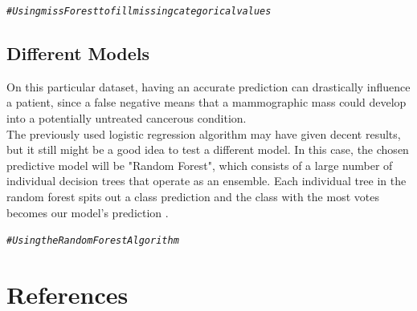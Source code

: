 \documentclass[a4paper,12pt]{article}\usepackage[]{graphicx}\usepackage[]{color}
\makeatletter
\newcommand{\hlcom}[1]{\textcolor[rgb]{0.678,0.584,0.686}{\textit{#1}}}%
\newenvironment{kframe}{%
 \def\at@end@of@kframe{}%
 \ifinner\ifhmode%
  \def\at@end@of@kframe{\end{minipage}}%
  \begin{minipage}{\columnwidth}%
 \fi\fi%
 \def\FrameCommand##1{\hskip\@totalleftmargin \hskip-\fboxsep
 \colorbox{shadecolor}{##1}\hskip-\fboxsep
     \hskip-\linewidth \hskip-\@totalleftmargin \hskip\columnwidth}%
 \MakeFramed {\advance\hsize-\width
   \@totalleftmargin\z@ \linewidth\hsize
   \@setminipage}}%
 {\par\unskip\endMakeFramed%
 \at@end@of@kframe}
\newenvironment{knitrout}{}{} %
\makeatother
\begin{document}
\begin{knitrout}
\color{fgcolor}\begin{kframe}
\begin{alltt}
\hlcom{# Using missForest to fill missing categorical values}
\end{alltt}
\end{kframe}
\end{knitrout}

\subsection{Different Models}\label{different_models}
On this particular dataset, having an accurate prediction can drastically influence a patient, since a false negative means that a  mammographic mass could develop into a potentially untreated cancerous condition.\\
The previously used logistic regression algorithm may have given decent results, but it still might be a good idea to test a different model. In this case, the chosen predictive model will be "Random Forest", which consists of a large number of individual decision trees that operate as an ensemble. Each individual tree in the random forest spits out a class prediction and the class with the most votes becomes our model’s prediction \cite{yiu_2019}.

\begin{knitrout}
\color{fgcolor}\begin{kframe}
\begin{alltt}
\hlcom{# Using the Random Forest Algorithm}
\end{alltt}
\end{kframe}
\end{knitrout}

\clearpage

\section{References}\label{pubs}

\printbibliography[heading =none]


\clearpage
\end{document}
